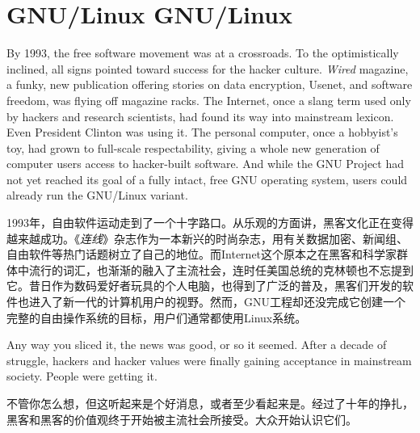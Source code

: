 \chapter{\ifdefined\eng
GNU/Linux
\fi
\ifdefined\chs
GNU/Linux
\fi}

\ifdefined\eng
By 1993, the free software movement was at a crossroads. To the optimistically inclined, all signs pointed toward success for the hacker culture. \textit{Wired} magazine, a funky, new publication offering stories on data encryption, Usenet, and software freedom, was flying off magazine racks. The Internet, once a slang term used only by hackers and research scientists, had found its way into mainstream lexicon. Even President Clinton was using it. The personal computer, once a hobbyist's toy, had grown to full-scale respectability, giving a whole new generation of computer users access to hacker-built software. And while the GNU Project had not yet reached its goal of a fully intact, free GNU operating system, users could already run the GNU/Linux variant.
\fi

\ifdefined\chs
1993年，自由软件运动走到了一个十字路口。从乐观的方面讲，黑客文化正在变得越来越成功。《\textit{连线}》杂志作为一本新兴的时尚杂志，用有关数据加密、新闻组、自由软件等热门话题树立了自己的地位。而Internet这个原本之在黑客和科学家群体中流行的词汇，也渐渐的融入了主流社会，连时任美国总统的克林顿也不忘提到它。昔日作为数码爱好者玩具的个人电脑，也得到了广泛的普及，黑客们开发的软件也进入了新一代的计算机用户的视野。然而，GNU工程却还没完成它创建一个完整的自由操作系统的目标，用户们通常都使用Linux系统。
\fi

\ifdefined\eng
Any way you sliced it, the news was good, or so it seemed. After a decade of struggle, hackers and hacker values were finally gaining acceptance in mainstream society. People were getting it.
\fi

\ifdefined\chs
不管你怎么想，但这听起来是个好消息，或者至少看起来是。经过了十年的挣扎，黑客和黑客的价值观终于开始被主流社会所接受。大众开始认识它们。
\fi

